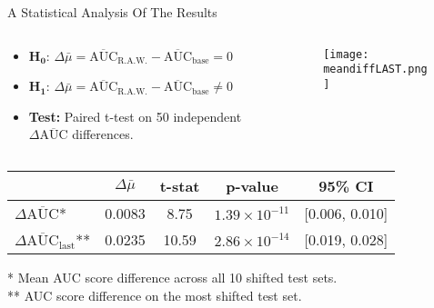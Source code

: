 \begin{frame}{A Statistical Analysis Of The Results}
    \begin{columns}[T]
        \begin{column}{0.6\textwidth}
            \begin{itemize}
                \item $\boldsymbol{H_0}$: $\Delta\bar{\mu} = \overline{\text{AUC}}_{\text{R.A.W.}} - \overline{\text{AUC}}_{\text{base}} = 0$ \\        
                \item $\boldsymbol{H_1}$: $\Delta\bar{\mu} = \overline{\text{AUC}}_{\text{R.A.W.}} - \overline{\text{AUC}}_{\text{base}} \neq 0$ \\
                
                
                \item \textbf{Test:} Paired t-test on 50 independent $\Delta\overline{\text{AUC}}$ differences.
            \end{itemize}
            
            
            
            
        \end{column}
        
        \begin{column}{0.4\textwidth}
            \vspace{1em}
            \begin{figure}
                \centering
                \texttt{[image: meandiffLAST.png]}
            \end{figure}
        \end{column}
    \end{columns}

    \begin{table}
        \centering
        \small
        \begin{tabular}{lcccc}
            \toprule
            & $\Delta\bar{\mu}$ & t-stat & p-value & 95\% CI \\
            \midrule
            $\Delta\overline{\text{AUC}}$* & 0.0083 & 8.75  & $1.39 \times 10^{-11}$ & [0.006, 0.010] \\
            $\Delta\overline{\text{AUC}}_{\text{last}}$** & 0.0235 & 10.59 & $2.86 \times 10^{-14}$ & [0.019, 0.028] \\
            \bottomrule
        \end{tabular}
    \end{table}
    
    \begin{footnotesize}
        * Mean AUC score difference across all 10 shifted test sets. \\
        ** AUC score difference on the most shifted test set.
    \end{footnotesize}
\end{frame}


    
